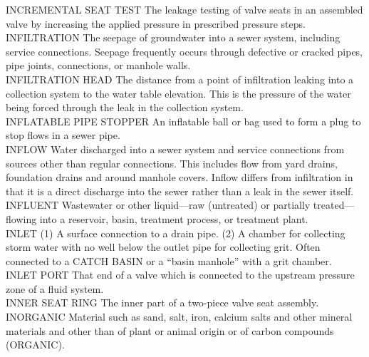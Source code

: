 INCREMENTAL SEAT TEST
The leakage testing of valve seats in an assembled valve by increasing the applied pressure in prescribed pressure steps.
\vspace{0.3cm}\\
INFILTRATION
The seepage of groundwater into a sewer system, including service connections. Seepage frequently occurs through defective or cracked pipes, pipe joints, connections, or manhole walls. 
\vspace{0.3cm}\\
INFILTRATION HEAD
The distance from a point of infiltration leaking into a collection system to the water table elevation. This is the pressure of the water being forced through the leak in the collection system. 
\vspace{0.3cm}\\
INFLATABLE PIPE STOPPER
An inflatable ball or bag used to form a plug to stop flows in a sewer pipe. 
\vspace{0.3cm}\\
INFLOW
Water discharged into a sewer system and service connections from sources other than regular connections. This includes flow from yard drains, foundation drains and around manhole covers. Inflow differs from infiltration in that it is a direct discharge into the sewer rather than a leak in the sewer itself.
\vspace{0.3cm}\\
INFLUENT
Wastewater or other liquid—raw (untreated) or partially treated—flowing into a reservoir, basin, treatment process, or treatment plant. 
\vspace{0.3cm}\\
INLET
(1) A surface connection to a drain pipe. (2) A chamber for collecting storm water with no well below the outlet pipe for collecting grit. Often connected to a CATCH BASIN or a “basin manhole” with a grit chamber. 
\vspace{0.3cm}\\
INLET PORT
That end of a valve which is connected to the upstream pressure zone of a fluid system.
\vspace{0.3cm}\\
INNER SEAT RING
The inner part of a two-piece valve seat assembly.
\vspace{0.3cm}\\
INORGANIC
Material such as sand, salt, iron, calcium salts and other mineral materials and other than of plant or animal origin or of carbon compounds (ORGANIC).
\vspace{0.3cm}\\
